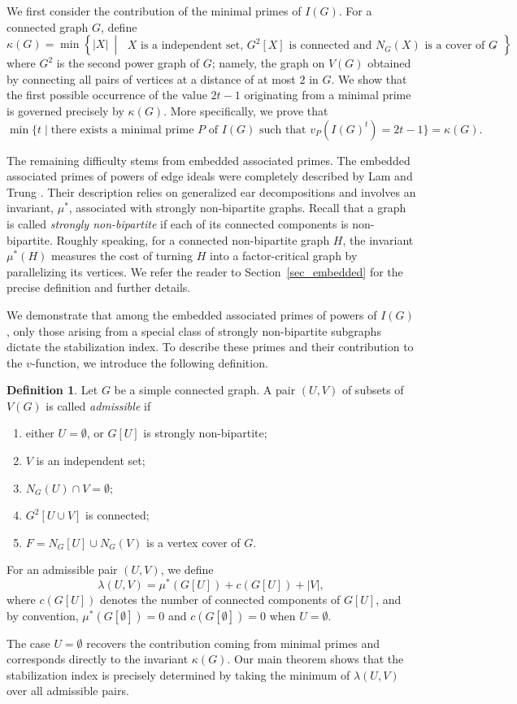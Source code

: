 \documentclass[12pt,reqno,twoside]{amsart}
\theoremstyle{definition}
\newtheorem{defn}[thm]{\bf Definition}
\theoremstyle{plain}
\theoremstyle{remark}
\numberwithin{equation}{section}
\begin{document}
We first consider the contribution of the minimal primes of $I(G)$. For a connected graph $G$, define
\[
\kappa(G) = \min \left\{ |X| \ \middle|\ \begin{array}{l} X \text{ is a independent set, } G^2[X] \text{ is connected and } N_G(X) \text{ is a cover of } G\end{array} \right\},
\]
where $G^2$ is the second power graph of $G$; namely, the graph on $V(G)$ obtained by connecting all pairs of vertices at a distance of at most $2$ in $G$. We show that the first possible occurrence of the value $2t - 1$ originating from a minimal prime is governed precisely by $\kappa(G)$. More specifically, we prove that 
\[
\min \{t \mid \text{there exists a minimal prime } P \text{ of } I(G) \text{ such that } v_P(I(G)^t) = 2t-1\} = \kappa(G).
\]

The remaining difficulty stems from embedded associated primes. The embedded associated primes of powers of edge ideals were completely described by Lam and Trung \cite{LT}. Their description relies on generalized ear decompositions and involves an invariant, $\mu^*$, associated with strongly non-bipartite graphs. Recall that a graph is called \emph{strongly non-bipartite} if each of its connected components is non-bipartite. Roughly speaking, for a connected non-bipartite graph $H$, the invariant $\mu^*(H)$ measures the cost of turning $H$ into a factor-critical graph by parallelizing its vertices. We refer the reader to Section~\ref{sec_embedded} for the precise definition and further details.

We demonstrate that among the embedded associated primes of powers of $I(G)$, only those arising from a special class of strongly non-bipartite subgraphs dictate the stabilization index. To describe these primes and their contribution to the $v$-function, we introduce the following definition.

\begin{defn}
Let $G$ be a simple connected graph. A pair $(U,V)$ of subsets of $V(G)$ is called \emph{admissible} if
\begin{enumerate}
    \item either $U = \emptyset$, or $G[U]$ is strongly non-bipartite;
    \item $V$ is an independent set;
    \item $N_G(U) \cap V = \emptyset$;
    \item $G^2[U \cup V]$ is connected;
    \item $F = N_G[U] \cup N_G(V)$ is a vertex cover of $G$.
\end{enumerate}
For an admissible pair $(U,V)$, we define
\[
\lambda(U,V) = \mu^*(G[U]) + c(G[U]) + |V|,
\]
where $c(G[U])$ denotes the number of connected components of $G[U]$, and by convention, $\mu^*(G[\emptyset]) = 0$ and $c(G[\emptyset]) = 0$ when $U = \emptyset$.
\end{defn}
The case $U = \emptyset$ recovers the contribution coming from minimal primes and corresponds directly to the invariant $\kappa(G)$. Our main theorem shows that the stabilization index is precisely determined by taking the minimum of $\lambda(U,V)$ over all admissible pairs.
\end{document}
